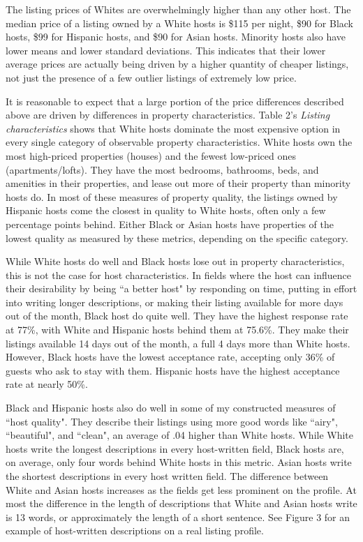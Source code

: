 \documentclass[11pt, oneside]{article}
\begin{document}
The listing prices of Whites are overwhelmingly higher than any other host. The median price of a listing owned by a White hosts is \$115 per night, \$90 for Black hosts, \$99 for Hispanic hosts, and \$90 for Asian hosts. Minority hosts also have lower means and lower standard deviations. This indicates that their lower average prices are actually being driven by a higher quantity of cheaper listings, not just the presence of a few outlier listings of extremely low price. 

It is reasonable to expect that a large portion of the price differences described above are driven by differences in property characteristics. Table 2's \textit{Listing characteristics} shows that White hosts dominate the most expensive option in every single category of observable property characteristics. White hosts own the most high-priced properties (houses) and the fewest low-priced ones (apartments/lofts). They have the most bedrooms, bathrooms, beds, and amenities in their properties, and lease out more of their property than minority hosts do. In most of these measures of property quality, the listings owned by Hispanic hosts come the closest in quality to White hosts, often only a few percentage points behind. Either Black or Asian hosts have properties of the lowest quality as measured by these metrics, depending on the specific category. 

While White hosts do well and Black hosts lose out in property characteristics, this is not the case for host characteristics. In fields where the host can influence their desirability by being ``a better host" by responding on time, putting in effort into writing longer descriptions, or making their listing available for more days out of the month, Black host do quite well. They have the highest response rate at 77\%, with White and Hispanic hosts behind them at 75.6\%. They make their listings available 14 days out of the month, a full 4 days more than White hosts. However, Black hosts have the lowest acceptance rate, accepting only 36\% of guests who ask to stay with them. Hispanic hosts have the highest acceptance rate at nearly 50\%. 

Black and Hispanic hosts also do well in some of my constructed measures of ``host quality". They describe their listings using  more good words like ``airy", ``beautiful", and ``clean", an average of .04 higher than White hosts. While White hosts write the longest descriptions in every host-written field, Black hosts are, on average, only four words behind White hosts in this metric. Asian hosts write the shortest descriptions in every host written field. The difference between White and Asian hosts increases as the fields get less prominent on the profile. At most the difference in the length of descriptions that White and Asian hosts write is 13 words, or approximately the length of a short sentence. See Figure 3 for an example of host-written descriptions on a real listing profile. 
\end{document}
